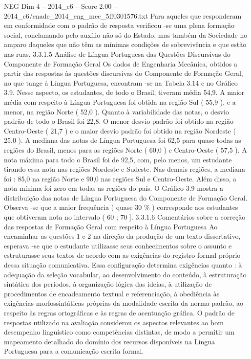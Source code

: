 \begin{textsample}{NEG Dim 4 – 2014\_c6 – Score 2.00 – 2014\_c6/enade\_2014\_eng\_mec\_5ff0301576.txt}
Para aqueles que responderam em conformidade com o padrão de resposta verificou -se uma plena formação social, conclamando pelo auxílio não só do Estado, mas também da Sociedade no amparo daqueles que não têm as mínimas condições de sobrevivência e que estão nas ruas. 3.3.1.5 Análise de Língua Portuguesa das Questões Discursivas do Componente de Formação Geral Os dados de Engenharia Mecânica, obtidos a partir das respostas às questões discursivas do Componente de Formação Geral, no que tange à Língua Portuguesa, encontram -se na Tabela 3.14 e no Gráfico 3.9.
Nesse aspecto, os estudantes, de todo o Brasil, tiveram média 54,9.
A maior média com respeito à Língua Portuguesa foi obtida na região Sul ( 55,9 ), e a menor, na região Norte ( 52,0 ).
Quanto à variabilidade das notas, o desvio padrão de todo o Brasil foi 22,8.
O menor desvio padrão foi obtido na região Centro-Oeste ( 21,7 ) e o maior desvio padrão foi obtido na região Nordeste ( 25,0 ).
A mediana das notas de Língua Portuguesa foi 62,5 para quase todas as regiões do Brasil, menos para as regiões Norte ( 60,0 ) e Centro-Oeste ( 57,5 ).
A nota máxima para todo o Brasil foi de 92,5, com, pelo menos, um estudante tirando essa nota nas regiões Nordeste e Sudeste.
Nas demais regiões, a mediana foi : 85,0 na região Norte e 90,0 nas regiões Sul e Centro-Oeste.
Além disso, a nota mínima foi zero em todas as regiões do país.
O Gráfico 3.9 mostra a distribuição das notas de Língua Portuguesa do Componente de Formação Geral.
Observa -se que a maior frequência ( quase 30 \% ) corresponde aos estudantes que obtiveram nota no intervalo ( 60 ; 70 ]. 3.3.1.6 Comentários sobre a correção das respostas de Formação Geral com respeito à Língua Portuguesa Ao encaminhar as questões 1 e 2 na direção da produção de um texto dissertativo, esperava -se que o estudante utilizasse seus conhecimentos sobre o assunto e estruturasse seus textos de acordo com as exigências do registro formal próprio dessa situação comunicativa.
Essa configuração determina exigências quanto : à adequação da seleção vocabular, ao desenvolvimento do conteúdo, à estruturação sintática dos períodos, à organização lógica das ideias, à utilização de procedimentos de encadeamento textual e referenciação, à obediência às exigências morfossintáticas próprias da modalidade escrita da norma-padrão, ao respeito às regras ortográficas e às regras de acentuação gráfica.
O padrão de respostas utilizado na avaliação considerou os aspectos relevantes ao bom desempenho linguístico como competências distintas, de modo a permitir um mapeamento detalhado do domínio dos recursos disponíveis na Língua Portuguesa para a comunicação escrita formal.

\end{textsample}
